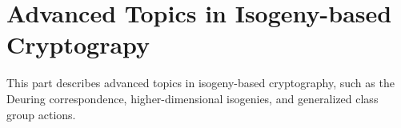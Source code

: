 \documentclass[../../main.tex]{subfiles}  %
\begin{document}
\chapter*{Advanced Topics in Isogeny-based Cryptograpy}
This part describes advanced topics in isogeny-based cryptography, such as the Deuring correspondence, 
higher-dimensional isogenies, and generalized class group actions.
\end{document}
